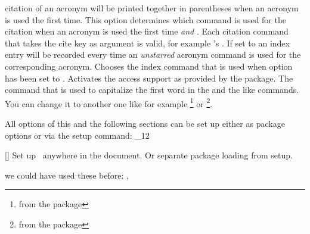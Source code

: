 \documentclass[load-preamble+]{cnltx-doc}
\makeatletter
\renewenvironment{commands}
  {%
    \cnltx@set@catcode_{12}%
    \let\command\cnltx@command
    \cnltxlist
  }
  {\endcnltxlist}
\makeatother
\begin{document}
\begin{options}
    citation of an acronym will be printed together in parentheses when an
    acronym is used the first time.
    This option determines which command is used for the
    citation when an acronym is used the first time \emph{and}
    .  Each citation command that takes the cite
    key as argument is valid, for example 's .
    If set to  an index entry will be recorded
    every time an \emph{unstarred} acronym command is used for the
    corresponding acronym.
    Chooses the index command that is used when option
     has been set to .
    Activates the access support as provided by the
     package.
    The command that is used to capitalize the first word in the  and
    the like commands.  You can change it to another one like for example
    \footnote{from the  package} or
    \footnote{from the  package}.
\end{options}
 
All options of this and the following sections can be set up either as package
options or via the setup command:
\begin{commands}
  \command{acsetup}[]
   Set up \acro\ anywhere in the document.  Or separate package loading from
   setup.
\end{commands}

\begin{example}
  we could have used these before: \nato, \ny
\end{example}
\end{document}

